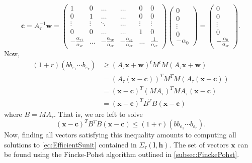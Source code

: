 \[\mathbf{c} = A_{\tau}^{-1}\mathbf{w} = \begin{pmatrix}
	1 & 0 & \dots &  \dots & 0 & 0\\ 
	0 & 1	& \dots & \dots & 0 & 0\\
	\vdots & \vdots & \ddots & \dots & \vdots & \vdots \\ 
	0 & 0 & \dots &  \dots & 1 & 0\\ 
	-\frac{\alpha_{\gamma 1}}{\alpha_{\varepsilon {r}}} & \dots &-\frac{\alpha_{\gamma {\nu}}}{\alpha_{\varepsilon {r}}} & -\frac{\alpha_{\varepsilon 1}}{\alpha_{\varepsilon r}} & \dots & \frac{1}{\alpha_{\varepsilon {r}}}
\end{pmatrix}
	\begin{pmatrix}
	0 \\ 0 \\ \vdots \\ 0 \\ -\alpha_0
	\end{pmatrix}
	= \begin{pmatrix}
	0 \\ 0 \\ \vdots \\ 0 \\ -\frac{\alpha_0}{\alpha_{\varepsilon r}}
\end{pmatrix}.\]
Now, 
\begin{align*}
(1 + r)(bb_{\varepsilon_1}\cdots b_{\varepsilon_r})
	& \geq (A_\tau \mathbf{x}+\mathbf{w})^tM^tM(A_\tau \mathbf{x}+\mathbf{w}) \\
	& = (A_\tau (\mathbf{x}-\mathbf{c}))^TM^TM(A_\tau (\mathbf{x}-\mathbf{c}))\\
	& = (\mathbf{x}-\mathbf{c})^T(MA_{\tau})^TMA_\tau(\mathbf{x}-\mathbf{c})\\
	& = (\mathbf{x}-\mathbf{c})^TB^TB(\mathbf{x}-\mathbf{c})
\end{align*}
where $B = MA_\tau$. That is, we are left to solve
\[(\mathbf{x}-\mathbf{c})^TB^TB(\mathbf{x}-\mathbf{c}) \leq (1 + r)(bb_{\varepsilon_1}\cdots b_{\varepsilon_r}).\]
Now, finding all vectors satisfying this inequality amounts to computing all solutions to \eqref{eq:EfficientSunit} contained in $\Sigma_{\tau}(\mathbf{l}, \mathbf{h})$. The set of vectors $\mathbf{x}$ can be found using the Fincke-Pohst algorithm outlined in \autoref{subsec:FinckePohst}. 


